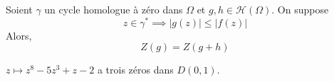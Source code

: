   \begin{application}
    Soient $\gamma$ un cycle homologue à zéro dans $\Omega$ et $g, h \in \mathcal{H}(\Omega)$. On suppose
    \[ z \in \gamma^* \implies \vert g(z) \vert \leq \vert f(z) \vert \]
    Alors,
    \[ Z(g) = Z(g + h) \]
  \end{application}


  \begin{example}
    $z \mapsto z^8 - 5z^3 + z - 2$ a trois zéros dans $D(0,1)$.
  \end{example}

